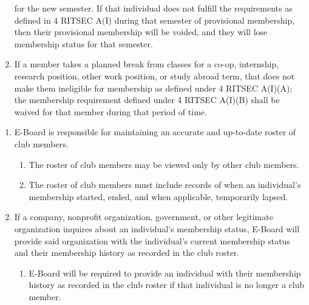 \begin{enumerate}
    for the new semester. If that individual does not fulfill the requirements
    as defined in 4 RITSEC A(I) during that semester of provisional
    membership, then their provisional membership will be voided, and they will
    lose membership status for that semester.
  \item If a member takes a planned break from classes for a co-op, internship,
    research position, other work position, or study abroad term, that does not
    make them ineligible for membership as defined under 4 RITSEC A(I)(A);
    the membership requirement defined under 4 RITSEC A(I)(B) shall be
    waived for that member during that period of time.
\end{enumerate}


\begin{enumerate}
  \item E-Board is responsible for maintaining an accurate and up-to-date
    roster of club members.
  \begin{enumerate}
    \item The roster of club members may be viewed only by other club members.
    \item The roster of club members must include records of when an
      individual's membership started, ended, and when applicable, temporarily
      lapsed.
  \end{enumerate}
  \item If a company, nonprofit organization, government, or other legitimate
    organization inquires about an individual's membership status, E-Board will
    provide said organization with the individual's current membership status
    and their membership history as recorded in the club roster.
  \begin{enumerate}
    \item E-Board will be required to provide an individual with their
      membership history as recorded in the club roster if that individual is
      no longer a club member.
  \end{enumerate}
\end{enumerate}
